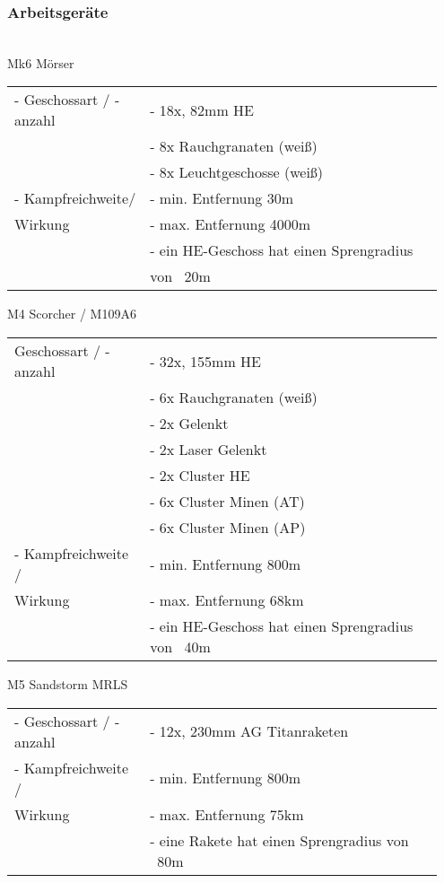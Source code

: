 \subsubsection{Arbeitsgeräte} \hfil\\
	Mk6 Mörser
	\begin{longtable}{p{0.3\linewidth} p{0.65\linewidth}}
		- Geschossart / -anzahl  	& - 18x, 82mm HE \\
		 				& - 8x Rauchgranaten (weiß) \\
		 				& - 8x Leuchtgeschosse (weiß) \\
		- Kampfreichweite/  	& - min. Entfernung 30m \\
		Wirkung  			& - max. Entfernung 4000m \\
		 				& - ein HE-Geschoss hat einen Sprengradius \\
		 				& von ~20m \\
	\end{longtable}

	M4 Scorcher / M109A6
	\begin{longtable}{p{0.3\linewidth} p{0.65\linewidth}}
		Geschossart / -anzahl  	& - 32x, 155mm HE \\
						& - 6x Rauchgranaten (weiß) \\
						& - 2x Gelenkt \\
 						& - 2x Laser Gelenkt \\
 						& - 2x Cluster HE \\
 						& - 6x Cluster Minen (AT) \\
 						& - 6x Cluster Minen (AP) \\
		- Kampfreichweite /  	& - min. Entfernung 800m \\
		Wirkung  			& - max. Entfernung 68km \\
 						& - ein HE-Geschoss hat einen Sprengradius von ~40m \\
	\end{longtable}

	M5 Sandstorm MRLS
	\begin{longtable}{p{0.3\linewidth} p{0.65\linewidth}}
		- Geschossart / -anzahl  	& - 12x, 230mm AG Titanraketen \\
		- Kampfreichweite / 	& - min. Entfernung 800m \\
		Wirkung  			& - max. Entfernung 75km \\
						& - eine Rakete hat einen Sprengradius von ~80m \\
	\end{longtable}

